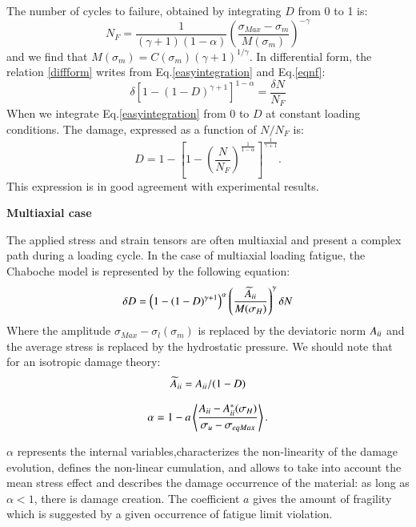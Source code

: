 \documentclass[3p,times,procedia,number]{elsarticle}
\begin{document}
The number of cycles to failure, obtained by integrating $D$ from 0 to 1 is:
\begin{equation}N_F=\frac{1}{(\gamma+1)(1-\alpha)}\left(\frac{\sigma_{Max}-\sigma_m}{M(\sigma_m)}\right)^{-\gamma}
\label{eqnf}
\end{equation}
and we find that $M(\sigma_m)=C(\sigma_m)(\gamma+1)^{1/\gamma}$. 
In differential form, the relation \eqref{diffform} writes from Eq.\eqref{easyintegration} and Eq.\eqref{eqnf}:
\begin{equation}\delta [1-(1-D)^{\gamma+1}]^{1-\alpha}=\frac{\delta N}{N_F}
\label{diffform}
\end{equation}
When we integrate Eq.\eqref{easyintegration} from $0$ to $D$ at constant loading conditions. The damage, expressed as a function of $N/N_F$ is:
\begin{equation}D=1-\left[ 1-\left( \frac{N}{N_F}\right) ^{\frac{1}{1-\alpha}}\right] ^{\frac{1}{\gamma+1}}.
\end{equation}
This expression is in good agreement with experimental results\cite{lemaitre1990mechanics}. 



\vspace{6pt}
\textbf{Multiaxial case}
\vspace{6pt}

The applied stress and strain tensors are often multiaxial and present a complex path during a loading cycle. In the case of multiaxial loading fatigue, the Chaboche model is represented by the following equation:
\begin{equation}\delta D = \left( 1 -(1-D)^{\gamma+1}\right)^\alpha \left(\frac{\widetilde{A}_{\uppercase\expandafter{\romannumeral2}}}{M(\sigma_H)}\right)^\gamma \delta N
\label{chabochemulti}
\end{equation} 
Where the amplitude $\sigma_{Max}-\sigma_l(\sigma_m)$ is replaced by the deviatoric norm $A_{\uppercase\expandafter{\romannumeral2}}$ and the average stress is replaced by the hydrostatic pressure. We should note that for an isotropic damage theory:
$$\widetilde{A}_{\uppercase\expandafter{\romannumeral2}}=A_{\uppercase\expandafter{\romannumeral2}}/(1-D)$$

\begin{equation}\alpha = 1 - a\left\langle \frac{A_{\uppercase\expandafter{\romannumeral2}} - A_{\uppercase\expandafter{\romannumeral2}}^\ast(\sigma_H)}{ \sigma_{u} - \sigma_{eqMax}}\right\rangle.\end{equation}

$\alpha$ represents the internal variables,characterizes the non-linearity of the damage evolution, defines
the non-linear cumulation, and allows to take into account the mean stress effect and describes the damage occurrence of the material: as long as $\alpha < 1$, there is damage creation. The coefficient $a$ gives the amount of fragility which is suggested by a given occurrence of fatigue limit violation.
\end{document}
